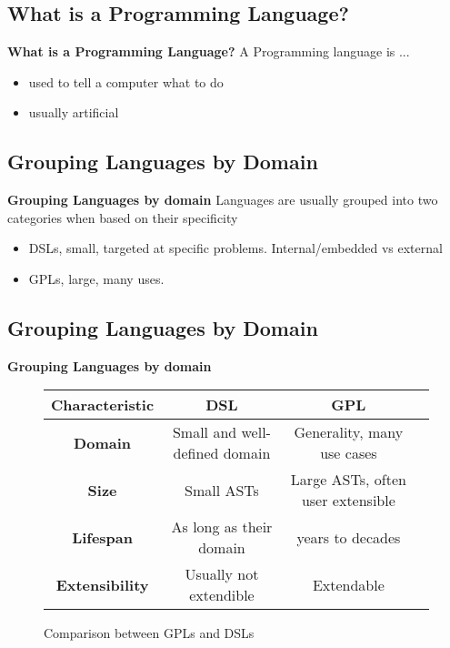 \subsection{What is a Programming Language?}
\begin{frame}{\textbf{What is a Programming Language?}}
    A Programming language is ...
    \begin{itemize}[<+->]
        \item used to tell a computer what to do
        \item usually artificial
    \end{itemize}
\end{frame}

\subsection{Grouping Languages by Domain}
\begin{frame}{\textbf{Grouping Languages by domain}}
    Languages are usually grouped into two categories when based on their specificity
    \begin{itemize}[<+->]
        \item DSLs, small,  targeted at specific problems. Internal/embedded vs external 
        \item GPLs, large, many uses.
    \end{itemize}
\end{frame}
\subsection*{Grouping Languages by Domain}
\begin{frame}{\textbf{Grouping Languages by domain}}
    \begin{figure}[!h]
        \centering
        \begin{tabular}{|c|c|c|c|}
            \hline
            \textbf{Characteristic} &\textbf{DSL } &\textbf{GPL}\\
            \hline
            \textbf{Domain} & Small and well-defined domain & Generality, many use cases\\
            \hline
            \textbf{Size} &Small ASTs & Large ASTs, often user extensible\\
            \hline
            \textbf{Lifespan} &As long as their domain &years to decades\\
            \hline
            \textbf{Extensibility} &Usually not extendible & Extendable\\
            \hline
        \end{tabular}%
        \caption{Comparison between GPLs and DSLs}
    \end{figure}%
\end{frame}


